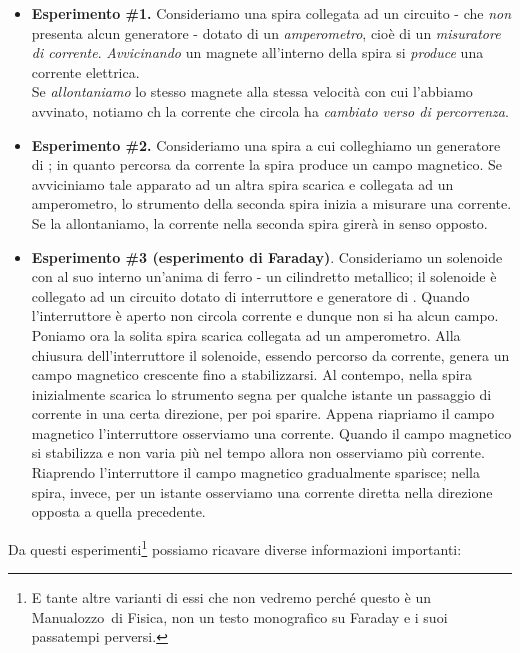 \begin{itemize}
	\item \textbf{Esperimento \#1.} Consideriamo una spira collegata ad un circuito - che \textit{non} presenta alcun generatore - dotato di un \textit{amperometro}, cioè di un \textit{misuratore di corrente}. \textit{Avvicinando} un magnete all'interno della spira si \textit{produce} una corrente elettrica.\\
	Se \textit{allontaniamo} lo stesso magnete alla stessa velocità con cui l'abbiamo avvinato, notiamo ch la corrente che circola ha \textit{cambiato verso di percorrenza}.
	\item \textbf{Esperimento \#2.} Consideriamo una spira a cui colleghiamo un generatore di \fem; in quanto percorsa da corrente la spira produce un campo magnetico. Se avviciniamo tale apparato ad un altra spira scarica e collegata ad un amperometro, lo strumento della seconda spira inizia a misurare una corrente. Se la allontaniamo, la corrente nella seconda spira girerà in senso opposto.
	\item \textbf{Esperimento \#3 (esperimento di Faraday)}. Consideriamo un solenoide con al suo interno un'anima di ferro - un cilindretto metallico; il solenoide è collegato ad un circuito dotato di interruttore e generatore di \fem. Quando l'interruttore è aperto non circola corrente e dunque non si ha alcun campo.\\
	Poniamo ora la solita spira scarica collegata ad un amperometro. Alla chiusura dell'interruttore il solenoide, essendo percorso da corrente, genera un campo magnetico crescente fino a stabilizzarsi. Al contempo, nella spira inizialmente scarica lo strumento segna per qualche istante un passaggio di corrente in una certa direzione, per poi sparire. Appena riapriamo il campo magnetico l'interruttore osserviamo una corrente. Quando il campo magnetico si stabilizza e non varia più nel tempo allora non osserviamo più corrente.\\
	Riaprendo l'interruttore il campo magnetico gradualmente sparisce; nella spira, invece, per un istante osserviamo una corrente diretta nella direzione opposta a quella precedente.
\end{itemize}
Da questi esperimenti\footnote{E tante altre varianti di essi che non vedremo perché questo è un Manualozzo\texttrademark\ di Fisica, non un testo monografico su Faraday e i suoi passatempi perversi.} possiamo ricavare diverse informazioni importanti:
